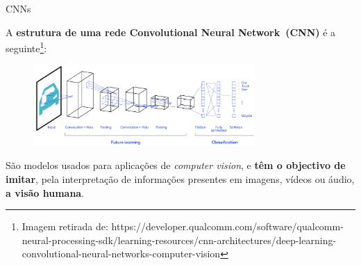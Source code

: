 \begin{frame}{CNNs}

A \textbf{estrutura de uma rede Convolutional Neural Network~(CNN)} é a seguinte\footnote{\tiny{Imagem retirada de: https://developer.qualcomm.com/software/qualcomm-neural-processing-sdk/learning-resources/cnn-architectures/deep-learning-convolutional-neural-networks-computer-vision}}:

\begin{figure}
    \centering
    \includegraphics[width=0.75\textwidth]{img/CNN.png}
\end{figure}

São modelos usados para aplicações de \textit{computer vision}, e \textbf{têm o objectivo de imitar}, pela interpretação de informações presentes em imagens, vídeos ou áudio, \textbf{a visão humana}.

\end{frame}

